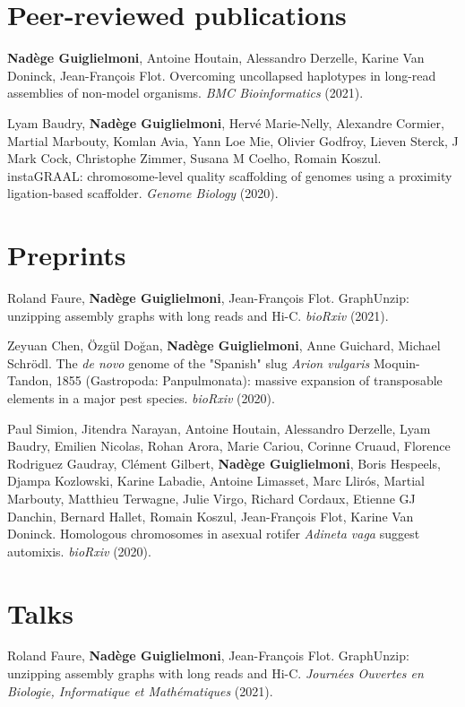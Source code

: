 \section*{Peer-reviewed publications}

\textbf{Nadège Guiglielmoni}, Antoine Houtain, Alessandro Derzelle, Karine Van Doninck, Jean-François Flot. Overcoming uncollapsed haplotypes in long-read assemblies of non-model organisms. \textit{BMC Bioinformatics} (2021).

Lyam Baudry, \textbf{Nadège Guiglielmoni}, Hervé Marie-Nelly, Alexandre Cormier, Martial Marbouty, Komlan Avia, Yann Loe Mie, Olivier Godfroy, Lieven Sterck, J Mark Cock, Christophe Zimmer, Susana M Coelho, Romain Koszul. instaGRAAL: chromosome-level quality scaffolding of genomes using a proximity ligation-based scaffolder. \textit{Genome Biology} (2020).

\section*{Preprints}

Roland Faure, \textbf{Nadège Guiglielmoni}, Jean-François Flot. GraphUnzip: unzipping assembly graphs with long reads and Hi-C. \textit{bioRxiv} (2021). 

Zeyuan Chen, Özgül Doğan, \textbf{Nadège Guiglielmoni}, Anne Guichard, Michael Schrödl. The \textit{de novo} genome of the "Spanish" slug \textit{Arion vulgaris} Moquin-Tandon, 1855 (Gastropoda: Panpulmonata): massive expansion of transposable elements in a major pest species. \textit{bioRxiv} (2020). 

Paul Simion, Jitendra Narayan, Antoine Houtain, Alessandro Derzelle, Lyam Baudry, Emilien Nicolas, Rohan Arora, Marie Cariou, Corinne Cruaud, Florence Rodriguez Gaudray, Clément Gilbert, \textbf{Nadège Guiglielmoni}, Boris Hespeels, Djampa Kozlowski, Karine Labadie, Antoine Limasset, Marc Llirós, Martial Marbouty, Matthieu Terwagne, Julie Virgo, Richard Cordaux, Etienne GJ Danchin, Bernard Hallet, Romain Koszul, Jean-François Flot, Karine Van Doninck. Homologous chromosomes in asexual rotifer \textit{Adineta vaga} suggest automixis. \textit{bioRxiv} (2020).

\section*{Talks}

Roland Faure, \textbf{Nadège Guiglielmoni}, Jean-François Flot. GraphUnzip: unzipping assembly graphs with long reads and Hi-C. \textit{Journées Ouvertes en Biologie, Informatique et Mathématiques} (2021).


